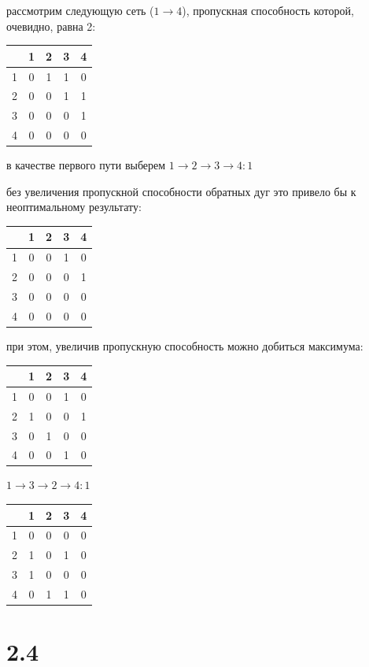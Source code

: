 \documentclass[russian]{article}
\begin{document}
рассмотрим следующую сеть ($1 \to 4$), пропускная способность которой, очевидно, равна 2:

\begin{tabular}{|c|c|c|c|c|}\hline
& 1& 2& 3& 4\\\hline
1&0&1&1&0\\\hline
2&0&0&1&1\\\hline
3&0&0&0&1\\\hline
4&0&0&0&0\\\hline
\end{tabular}

в качестве первого пути выберем $ 1 \to 2 \to 3 \to 4 : 1$

без увеличения пропускной способности обратных дуг это привело бы к неоптимальному результату:

\begin{tabular}{|c|c|c|c|c|}\hline
& 1& 2& 3& 4\\\hline
1&0&0&1&0\\\hline
2&0&0&0&1\\\hline
3&0&0&0&0\\\hline
4&0&0&0&0\\\hline
\end{tabular}

при этом, увеличив пропускную способность можно добиться максимума:

\begin{tabular}{|c|c|c|c|c|}\hline
& 1& 2& 3& 4\\\hline
1&0&0&1&0\\\hline
2&1&0&0&1\\\hline
3&0&1&0&0\\\hline
4&0&0&1&0\\\hline
\end{tabular}

$1 \to 3 \to 2 \to 4 : 1$

\begin{tabular}{|c|c|c|c|c|}\hline
& 1& 2& 3& 4\\\hline
1&0&0&0&0\\\hline
2&1&0&1&0\\\hline
3&1&0&0&0\\\hline
4&0&1&1&0\\\hline
\end{tabular}

\section*{2.4}
\end{document}
